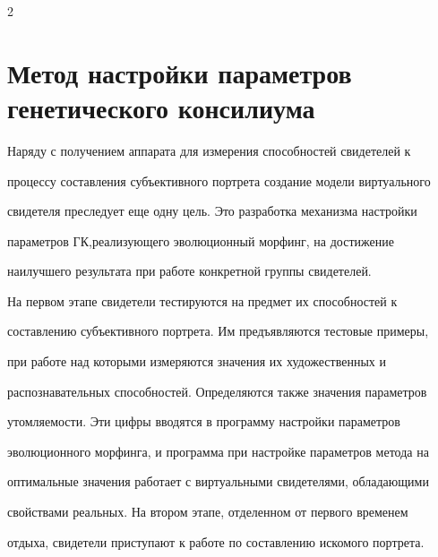 \begin{multicols}{2}
\begin{figure}[b]
\vspace*{-9pt}




\end{figure}





\section{Метод настройки параметров генетического консилиума}


     


     Наряду с получением аппарата для измерения способностей свидетелей к 


процессу составления субъективного портрета создание модели виртуального 


свидетеля преследует еще одну цель. Это разработка механизма настройки 


параметров ГК,\linebreak реализующего эволюционный морфинг, на достижение 


наилучшего результата при работе конкретной группы свидетелей. 


     


     На первом этапе свидетели тестируются на предмет их способностей к 


составлению субъективного портрета. Им предъявляются тестовые примеры, 


при работе над которыми измеряются значения их художественных и 


распознавательных способностей. Определяются также значения параметров 


утомляемости. Эти цифры вводятся в программу настройки параметров 


эволюционного морфинга, и программа при настройке параметров метода на 


оптимальные значения работает с виртуальными свидетелями, обладающими 


свойствами реальных. На втором этапе, отделенном от первого временем 


отдыха, свидетели приступают к работе по со\-став\-ле\-нию искомого портрета. 


     



\end{multicols}
